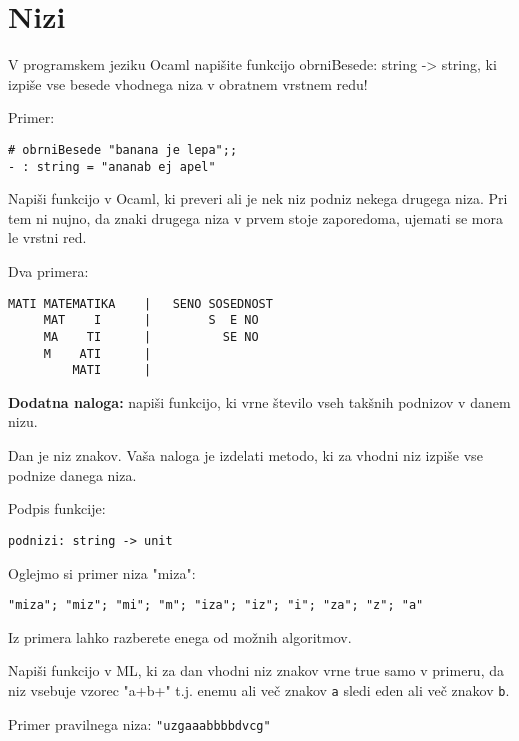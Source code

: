\section{Nizi}
\begin{ex} 
V programskem jeziku Ocaml napi\v site funkcijo obrniBesede: string -> string, ki izpi\v se vse besede vhodnega niza v obratnem vrstnem redu!

Primer:
\begin{verbatim}
# obrniBesede "banana je lepa";;
- : string = "ananab ej apel"
\end{verbatim}

\end{ex}
\begin{ex}
Napi\v si funkcijo v Ocaml, ki preveri ali je nek niz podniz nekega drugega niza. Pri tem ni nujno, da znaki drugega niza v prvem stoje zaporedoma, ujemati se mora le vrstni red.

Dva primera:                    
\begin{verbatim}
MATI MATEMATIKA    |   SENO SOSEDNOST 
     MAT    I      |        S  E NO 
     MA    TI      |          SE NO 
     M    ATI      |
         MATI      |
\end{verbatim}
\textbf{Dodatna naloga:} napi\v si funkcijo, ki vrne \v stevilo vseh tak\v snih podnizov v danem nizu.
\end{ex}

\begin{ex} 
Dan je niz znakov. Va\v sa naloga je izdelati metodo, ki za vhodni niz izpi\v se vse podnize danega niza.

Podpis funkcije:
\begin{verbatim}
podnizi: string -> unit 
\end{verbatim}

Oglejmo si primer niza "miza":
\begin{verbatim}
"miza"; "miz"; "mi"; "m"; "iza"; "iz"; "i"; "za"; "z"; "a" 
\end{verbatim}

Iz primera lahko razberete enega od mo\v znih algoritmov.
\end{ex}

\begin{ex} 
Napi\v si funkcijo v ML, ki za dan vhodni niz znakov vrne true samo v primeru, da niz vsebuje vzorec "a+b+" t.j. enemu ali ve\v c znakov \texttt{a} sledi eden ali ve\v c znakov \texttt{b}.

Primer pravilnega niza: \texttt{"uzgaaabbbbdvcg"}

\end{ex}





